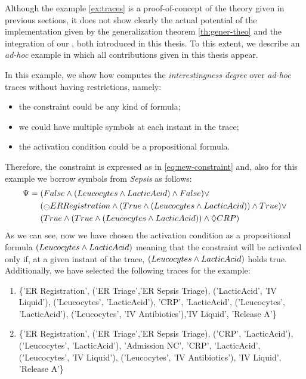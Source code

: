 Although the example \ref{ex:traces} is a proof-of-concept of the theory given in previous sections, it does not show clearly the actual potential of the \janus implementation given by the generalization theorem \ref{th:gener-theo} and the integration of our \LTLfToDFA, both introduced in this thesis. To this extent, we describe an \textit{ad-hoc} example in which all contributions given in this thesis appear.

\begin{example}\label{ex:adhoc-result}
In this example, we show how \janus computes the \textit{interestingness degree} over \textit{ad-hoc} traces without having restrictions, namely:

\begin{itemize}
\item the constraint could be any kind of formula;
\item we could have multiple symbols at each instant in the trace;
\item the activation condition could be a propositional formula.
\end{itemize}

\noindent Therefore, the constraint is expressed as in \ref{eq:new-constraint} and, also for this example we borrow symbols from \textit{Sepsis} as follows:
\begin{align*}
\Psi = \;& (False \lAND (Leucocytes \lAND LacticAcid) \lAND False) \lOR \\
& (\Yesterday ER Registration \lAND (True \lAND (Leucocytes \lAND LacticAcid)) \lAND True) \lOR\\
& (True \lAND (True \lAND (Leucocytes \lAND LacticAcid)) \lAND \Diamond CRP)
\end{align*}
As we can see, now we have chosen the activation condition as a propositional formula $(Leucocytes \wedge LacticAcid)$ meaning that the constraint will be activated only if, at a given instant of the trace, $(Leucocytes \wedge LacticAcid)$ holds true.
Additionally, we have selected the following traces for the example:
\begin{enumerate}
\item \label{list:adhoc-trace1} \{'ER Registration', ('ER Triage','ER Sepsis Triage), ('LacticAcid', 'IV Liquid'),  ('Leucocytes', 'LacticAcid'), 'CRP', 'LacticAcid', ('Leucocytes', 'LacticAcid'), ('Leucocytes', 'IV Antibiotics'),'IV Liquid', 'Release A'\}
\item \label{list:adhoc-trace2} \{'ER Registration', ('ER Triage','ER Sepsis Triage), ('CRP', 'LacticAcid'),  ('Leucocytes', 'LacticAcid'), 'Admission NC', 'CRP', 'LacticAcid', ('Leucocytes', 'IV Liquid'), ('Leucocytes', 'IV Antibiotics'), 'IV Liquid', 'Release A'\}
\end{enumerate}


\end{example}
